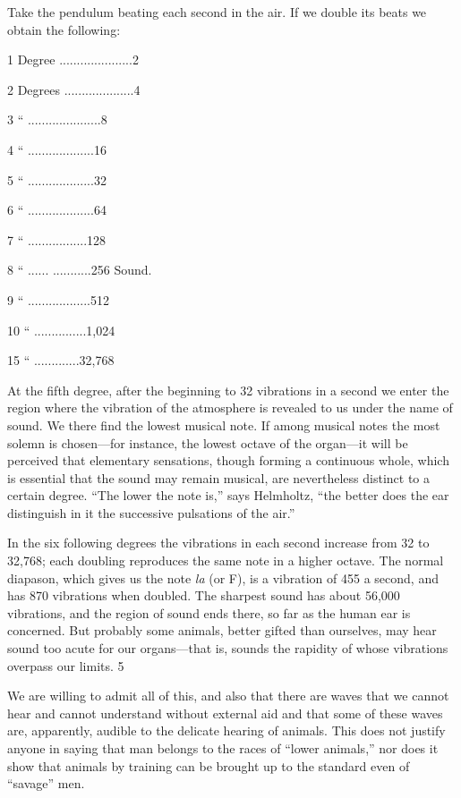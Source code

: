 Take the pendulum beating each second in the air. If we double its beats we obtain the
following:

1 Degree .....................2

2 Degrees ....................4

3 `` .....................8

4 `` ...................16

5 `` ...................32

6 `` ...................64

7 `` .................128

8 `` ...... ...........256 Sound.

9 `` ..................512

10 `` ...............1,024

15 `` .............32,768

At the fifth degree, after the beginning to 32 vibrations in a second we enter the region where
the vibration of the atmosphere is revealed to us under the name of sound. We there find the
lowest musical note. If among musical notes the most solemn is chosen—for instance, the
lowest octave of the organ—it will be perceived that elementary sensations, though forming a
continuous whole, which is essential that the sound may remain musical, are nevertheless
distinct to a certain degree. ``The lower the note is,'' says Helmholtz, ``the better does the ear
distinguish in it the successive pulsations of the air.''

In the six following degrees the vibrations in each second increase from 32 to 32,768; each
doubling reproduces the same note in a higher octave. The normal diapason, which gives us
the note \textit{la} (or F), is a vibration of 455 a second, and has 870 vibrations when doubled. The
sharpest sound has about 56,000 vibrations, and the region of sound ends there, so far as the
human ear is concerned. But probably some animals, better gifted than ourselves, may hear
sound too acute for our organs—that is, sounds the rapidity of whose vibrations overpass our
limits. 5

We are willing to admit all of this, and also that there are waves that we cannot hear and
cannot understand without external aid and that some of these waves are, apparently, audible
to the delicate hearing of animals. This does not justify anyone in saying that man belongs to
the races of ``lower animals,'' nor does it show that animals by training can be brought up to
the standard even of ``savage'' men.

